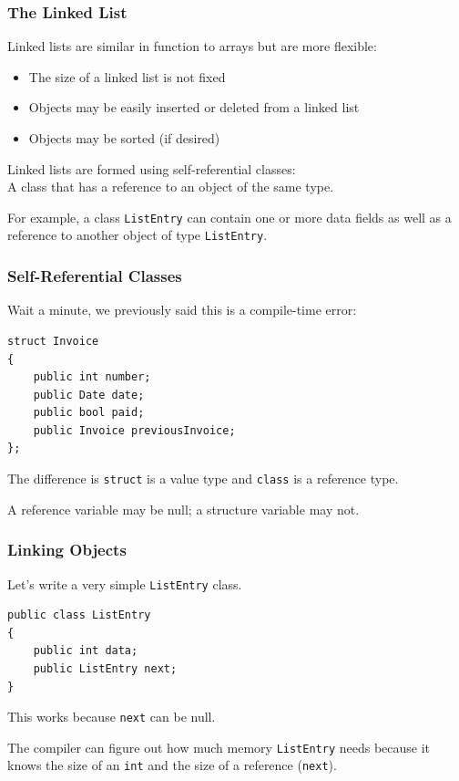 \begin{frame}
\frametitle{The Linked List}

Linked lists are similar in function to arrays but are more flexible:
\begin{itemize}
    \item The size of a linked list is not fixed
    \item Objects may be easily inserted or deleted from a linked list
    \item Objects may be sorted (if desired)
\end{itemize}

Linked lists are formed using self-referential classes:\\
\quad A class that has a reference to an object of the same type.

For example, a class \texttt{ListEntry} can contain one or more data fields as well as a reference to another object of type \texttt{ListEntry}.

\end{frame}


\begin{frame}[fragile]
\frametitle{Self-Referential Classes}

Wait a minute, we previously said this is a compile-time error:

\begin{verbatim}
struct Invoice
{
    public int number;
    public Date date;
    public bool paid;
    public Invoice previousInvoice;
};
\end{verbatim}

The difference is \texttt{struct} is a value type and \texttt{class} is a reference type.

A reference variable may be null; a structure variable may not.

\end{frame}

\begin{frame}[fragile]
\frametitle{Linking Objects}

Let's write a very simple \texttt{ListEntry} class.

\begin{verbatim}
public class ListEntry
{
    public int data;
    public ListEntry next;
}
\end{verbatim}

This works because \texttt{next} can be null. 

The compiler can figure out how much memory \texttt{ListEntry} needs because it knows the size of an \texttt{int} and the size of a reference (\texttt{next}).

\end{frame}

